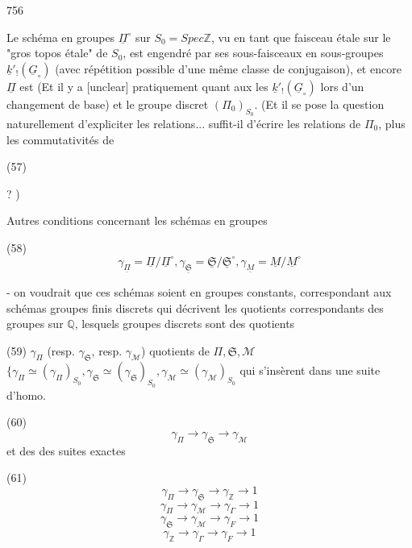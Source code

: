 \newpage


756

Le schéma en groupes $\underline{\Pi}^\circ$ sur $S_0 = Spec \mathbb{Z}$, vu en tant
que faisceau étale sur le "gros topos étale" de
$S_0$, est engendré par ses sous-faisceaux en
sous-groupes
$\underline{k}'_!(\underline{G}_\circ)$ (avec répétition possible d'une même
classe de conjugaison), et encore $\underline{\Pi}$ est
(Et il y a [unclear] pratiquement quant aux
les $\underline{k}'_!(\underline{G}_\circ)$ lors d'un changement de base) et
le groupe discret $(\Pi_0)_{S_0}$. (Et il se pose
la question naturellement d'expliciter les
relations... suffit-il d'écrire les relations de
$\Pi_0$, plus les commutativités de

(57)
? )

Autres conditions concernant les schémas
en groupes

(58)
$$ \gamma_{\underline{\Pi}} = \underline{\Pi} / \underline{\Pi}^\circ, \gamma_{\underline{\mathfrak{S}}} = \underline{\mathfrak{S}} / \underline{\mathfrak{S}}^\circ, \gamma_{\underline{M}} = \underline{M} / \underline{M}^\circ $$

- on voudrait que ces schémas soient
en groupes constants, correspondant aux
schémas groupes finis discrets qui décrivent les
quotients correspondants des groupes sur $\mathbb{Q}$,
lesquels groupes discrets sont des quotients

\newpage


(59) $\gamma_{\Pi}$ (resp. $\gamma_{\mathfrak{S}}$, resp. $\gamma_{\mathcal{M}}$) quotients de $\Pi, \mathfrak{S}, \mathcal{M}$
$\Big\{ \gamma_{\Pi} \simeq (\gamma_{\Pi})_{S_0}, \gamma_{\mathfrak{S}} \simeq (\gamma_{\mathfrak{S}})_{S_0}, \gamma_{\mathcal{M}} \simeq (\gamma_{\mathcal{M}})_{S_0}$
qui s'insèrent dans une suite d'homo.

(60) $$ \gamma_{\Pi} \to \gamma_{\mathfrak{S}} \to \gamma_{\mathcal{M}} $$
et des des suites exactes

(61)
$$ \gamma_{\Pi} \to \gamma_{\mathfrak{S}} \to \gamma_{\mathbb{Z}} \to 1 $$
$$ \gamma_{\Pi} \to \gamma_{\mathcal{M}} \to \gamma_{\Gamma} \to 1 $$
$$ \gamma_{\mathfrak{S}} \to \gamma_{\mathcal{M}} \to \gamma_{F} \to 1 $$
$$ \gamma_{\mathbb{Z}} \to \gamma_{\Gamma} \to \gamma_{F} \to 1 $$

